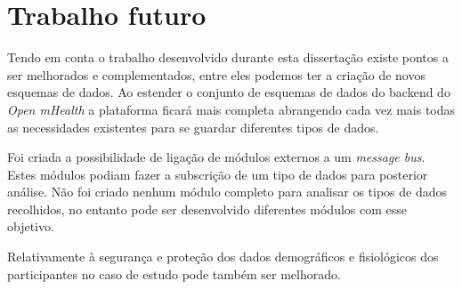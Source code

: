 \section{Trabalho futuro}
Tendo em conta o trabalho desenvolvido durante esta dissertação existe pontos a ser melhorados e complementados, entre eles podemos ter a criação de novos esquemas de dados. Ao estender o conjunto de esquemas de dados do backend do \textit{Open mHealth} a plataforma ficará mais completa abrangendo cada vez mais todas as necessidades existentes para se guardar diferentes tipos de dados.\par
Foi criada a possibilidade de ligação de módulos externos a um \textit{message bus}. Estes módulos podiam fazer a subscrição de um tipo de dados para posterior análise. Não foi criado nenhum módulo completo para analisar os tipos de dados recolhidos, no entanto pode ser desenvolvido diferentes módulos com esse objetivo.\par
Relativamente à segurança e proteção dos dados demográficos e fisiológicos dos participantes no caso de estudo pode também ser melhorado.

\cleardoublepage